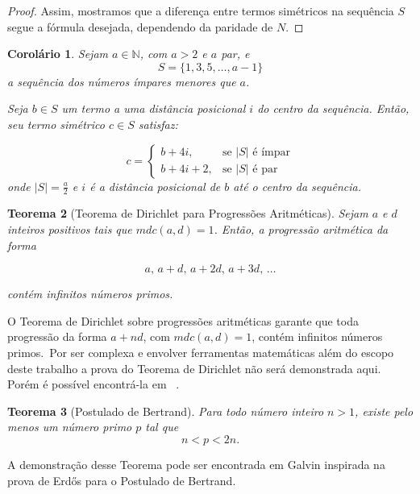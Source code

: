 \documentclass[a4paper,11pt]{article}
\newtheorem{theorem}{Teorema}[section]
\newtheorem{corollary}[theorem]{Corolário}
\theoremstyle{definition}
\theoremstyle{remark}
\begin{document}
\begin{otherlanguage}{brazil}
\begin{proof}
		Assim, mostramos que a diferença entre termos simétricos na sequência $S$ segue a fórmula desejada, dependendo da paridade de $N$.
		
	\end{proof}
	
	\begin{corollary} \label{coro:par_simetrico}
		Sejam $a \in \mathbb{N}$, com $a > 2$ e $a$ par, e
		\[
		S = \{1, 3, 5, \dotsc, a - 1\}
		\]
		a sequência dos números ímpares menores que $a$.
		
		Seja $b \in S$ um termo a uma distância posicional $i$ do centro da sequência. Então, seu termo simétrico $c \in S$ satisfaz:
		
		\[
		c =
		\begin{cases}
			b + 4i, & \text{se } |S| \text{ é ímpar} \\
			b + 4i + 2, & \text{se } |S| \text{ é par}
		\end{cases}
		\]
		onde $|S| = \frac{a}{2}$ e $i$ é a distância posicional de $b$ até o centro da sequência.
	\end{corollary}
	
	
	
	\begin{theorem}[Teorema de Dirichlet para Progressões Aritméticas] \label{teo:dirichlet}
		Sejam $a$ e $d$ inteiros positivos tais que $mdc(a, d) = 1$. Então, a progressão aritmética da forma
		
		\[
		a,\, a + d,\, a + 2d,\, a + 3d,\, \dots
		\]
		
		contém infinitos números primos.
	\end{theorem}
	
	O Teorema de Dirichlet sobre progressões aritméticas garante que toda progressão da forma $a + nd$, com $mdc(a, d) = 1$, contém infinitos números primos.~Por ser complexa e envolver ferramentas matemáticas além do escopo deste trabalho a prova do Teorema de Dirichlet não será demonstrada aqui. Porém é possível encontrá-la em ~\cite{apostol}.  
	
	\begin{theorem}[Postulado de Bertrand]\label{teo:postulado_de_bertrand}
		Para todo número inteiro \( n > 1 \), existe pelo menos um número primo \( p \) tal que
		\[
		n < p < 2n.
		\]
	\end{theorem}
	
	A demonstração desse Teorema pode ser encontrada em Galvin \cite{Galvin2013} inspirada na prova de Erdős para o Postulado de Bertrand.
	

\end{otherlanguage}
\end{document}
